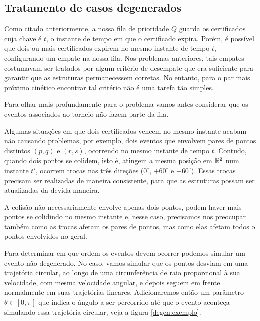 
\FloatBarrier
\subsection{Tratamento de casos degenerados}

Como citado anteriormente, a nossa fila de prioridade $Q$ guarda os
certificados cuja chave é $t$, o instante de tempo em que o certificado
expira. Porém, é possível que dois ou mais certificados expirem no mesmo
instante de tempo $t$, configurando um empate na nossa fila. Nos problemas
anteriores, tais empates costumavam ser tratados por algum critério de
desempate que era suficiente para garantir que as estruturas permanecessem
corretas. No entanto, para o par mais próximo cinético encontrar tal
critério não é uma tarefa tão simples.

Para olhar mais profundamente para o problema vamos antes considerar que os
eventos associados ao torneio não fazem parte da fila.

Algumas situações em que dois certificados vencem no mesmo instante acabam
não causando problemas, por exemplo, dois eventos que envolvem pares de
pontos distintos $(p, q)$ e $(r, s)$, ocorrendo no mesmo instante de tempo
$t$. Contudo, quando dois pontos se colidem, isto é, atingem a mesma posição
em $\mathbb{R}^2$ num instante $t'$, ocorrem trocas nas três direções ($0^\circ$,
$+60^\circ$ e $-60^\circ$). Essas trocas precisam ser realizadas de maneira
consistente, para que as estruturas possam ser atualizadas da devida
maneira.

A colisão não necessariamente envolve apenas dois pontos, podem haver mais
pontos se colidindo no mesmo instante e, nesse caso, precisamos nos
preocupar também como as trocas afetam os pares de pontos, mas como elas
afetam todos o pontos envolvidos no geral.

Para determinar em que ordem os eventos devem ocorrer podemos simular um
evento não degenerado. No caso, vamos simular que os pontos desviam em uma
trajetória circular, ao longo de uma circunferência de raio proporcional à
sua velocidade, com mesma velocidade angular, e depois seguem em frente
normalmente em suas trajetórias lineares. Adicionaremos então um parâmetro
$\theta \in [0, \pi]$ que indica o ângulo a ser percorrido até que o evento
aconteça simulando essa trajetória circular, veja a figura
\ref{degen:exemplo}.

